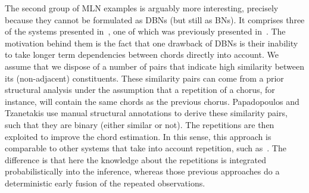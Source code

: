 \documentclass[letterpaper]{article} %
\begin{document}
The second group of MLN examples is arguably more interesting, precisely because they cannot be formulated as DBNs (but still as BNs). It comprises three of the systems presented in~\cite{papadopoulos2017taslp}, one of which was previously presented in~\cite{papadopoulos2013icassp}. The motivation behind them is the fact that one drawback of DBNs is their inability to take longer term dependencies between chords directly into account. We assume that we dispose of a number of pairs that indicate high similarity between its (non-adjacent) constituents. These similarity pairs can come from a prior structural analysis under the assumption that a repetition of a chorus, for instance, will contain the same chords as the previous chorus. Papadopoulos and Tzanetakis use manual structural annotations to derive these similarity pairs, such that they are binary (either similar or not). The repetitions are then exploited to improve the chord estimation. In this sense, this approach is comparable to other systems that take into account repetition, such as~\cite{mauch2009ismir,cho2011ismir}. The difference is that here the knowledge about the repetitions is integrated probabilistically into the inference, whereas those previous approaches do a deterministic early fusion of the repeated observations.
\end{document}
